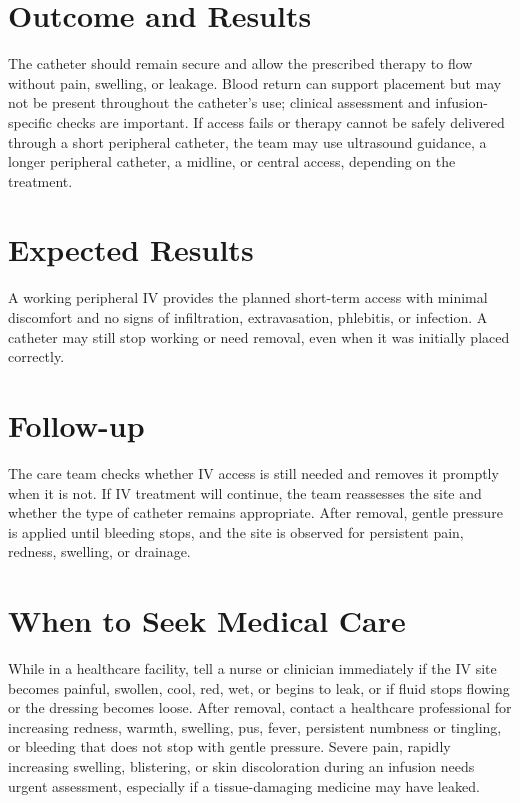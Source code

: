 \section*{Outcome and Results}
The catheter should remain secure and allow the prescribed therapy to flow without pain, swelling, or leakage. Blood return can support placement but may not be present throughout the catheter's use; clinical assessment and infusion-specific checks are important. If access fails or therapy cannot be safely delivered through a short peripheral catheter, the team may use ultrasound guidance, a longer peripheral catheter, a midline, or central access, depending on the treatment.

\section*{Expected Results}
A working peripheral IV provides the planned short-term access with minimal discomfort and no signs of infiltration, extravasation, phlebitis, or infection. A catheter may still stop working or need removal, even when it was initially placed correctly.

\section*{Follow-up}
The care team checks whether IV access is still needed and removes it promptly when it is not. If IV treatment will continue, the team reassesses the site and whether the type of catheter remains appropriate. After removal, gentle pressure is applied until bleeding stops, and the site is observed for persistent pain, redness, swelling, or drainage.

\section*{When to Seek Medical Care}
While in a healthcare facility, tell a nurse or clinician immediately if the IV site becomes painful, swollen, cool, red, wet, or begins to leak, or if fluid stops flowing or the dressing becomes loose. After removal, contact a healthcare professional for increasing redness, warmth, swelling, pus, fever, persistent numbness or tingling, or bleeding that does not stop with gentle pressure. Severe pain, rapidly increasing swelling, blistering, or skin discoloration during an infusion needs urgent assessment, especially if a tissue-damaging medicine may have leaked.

